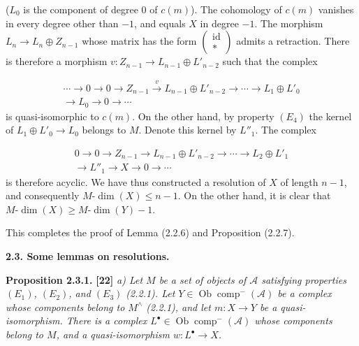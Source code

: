 \clearpage
{}%
\begingroup\small\setlength{\parskip}{0pt}\setlength{\emergencystretch}{1.5em}
\setlength{\abovedisplayskip}{4pt plus 2pt minus 2pt}%
\setlength{\belowdisplayskip}{4pt plus 2pt minus 2pt}%

($L_0$ is the component of degree $0$ of $c(m)$). The cohomology of
$c(m)$ vanishes in every degree other than $-1$, and equals $X$ in degree
$-1$. The morphism $L_n\longrightarrow L_n\oplus Z_{n-1}$ whose matrix
has the form $\begin{pmatrix}\operatorname{id}\\ *\end{pmatrix}$ admits a
retraction. There is therefore a morphism
$v\colon Z_{n-1}\longrightarrow L_{n-1}\oplus L'_{n-2}$ such that the
complex

\[
\begin{aligned}
\cdots\longrightarrow0\longrightarrow0\longrightarrow Z_{n-1}
\xrightarrow{v}L_{n-1}\oplus L'_{n-2}\longrightarrow\cdots
\longrightarrow L_1\oplus L'_0\\
\longrightarrow L_0\longrightarrow0\longrightarrow\cdots
\end{aligned}
\]
is quasi-isomorphic to $c(m)$. On the other hand, by property $(E_4)$ the
kernel of $L_1\oplus L'_0\longrightarrow L_0$ belongs to $M$. Denote this
kernel by $L''_1$. The complex

\[
\begin{aligned}
0\longrightarrow0\longrightarrow Z_{n-1}
\longrightarrow L_{n-1}\oplus L'_{n-2}\longrightarrow\cdots
\longrightarrow L_2\oplus L'_1\\
\longrightarrow L''_1\longrightarrow X\longrightarrow0\longrightarrow\cdots
\end{aligned}
\]
is therefore acyclic. We have thus constructed a resolution of $X$ of
length $n-1$, and consequently $M\text{-}\dim(X)\leq n-1$. On the other
hand, it is clear that
$M\text{-}\dim(X)\geq M\text{-}\dim(Y)-1$.

This completes the proof of Lemma (2.2.6) and Proposition (2.2.7).

\medskip\noindent\textbf{2.3. Some lemmas on resolutions.}

\medskip\noindent\textbf{Proposition 2.3.1.} \textbf{[22]}\quad
\textit{a) Let $M$ be a set of objects of $\mathcal A$ satisfying
properties $(E_1)$, $(E_2)$, and $(E_3)$ (2.2.1). Let
$Y\in\operatorname{Ob}\operatorname{comp}^{-}(\mathcal A)$ be a complex
whose components belong to $M^\wedge$ (2.2.1), and let
$m\colon X\longrightarrow Y$ be a quasi-isomorphism. There is a complex
$L^\bullet\in\operatorname{Ob}\operatorname{comp}^{-}(\mathcal A)$ whose
components belong to $M$, and a quasi-isomorphism
$w\colon L^\bullet\longrightarrow X$.}

